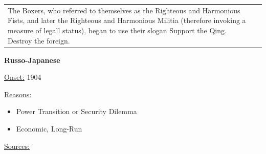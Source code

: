 {\begin{longtable}{p{}p{}}
The Boxers, who referred to themselves as the Righteous and Harmonious Fists, and later the Righteous and Harmonious Militia (therefore invoking a measure of legall status), began to use their slogan Support the Qing. Destroy the foreign.
\\
\end{longtable}}
\clearpage
         \textbf{Russo-Japanese} 

          \underline{Onset:} 1904         

\underline{Reasons:}
\begin{itemize}
\item Power Transition or Security Dilemma
\item Economic, Long-Run
\end{itemize}

         \underline{Sources:} 
